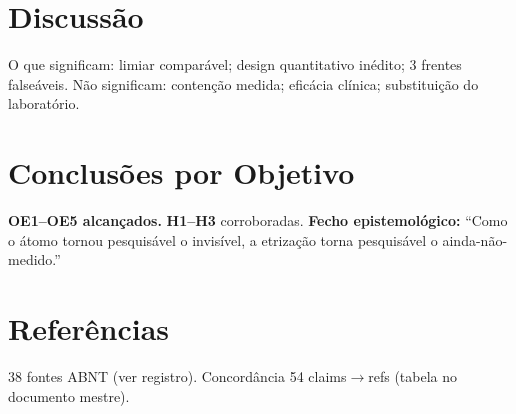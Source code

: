 \documentclass[10pt,twocolumn]{article}
\begin{document}
\section{Discussão}
O que significam: limiar comparável; design quantitativo inédito; 3 frentes falseáveis. Não significam: contenção medida; eficácia clínica; substituição do laboratório.

\section{Conclusões por Objetivo}
\textbf{OE1--OE5 alcançados.} \textbf{H1--H3} corroboradas. \textbf{Fecho epistemológico:} ``Como o átomo tornou pesquisável o invisível, a etrização torna pesquisável o ainda-não-medido.''

\section*{Referências}
38 fontes ABNT (ver registro). Concordância 54 claims$\to$refs (tabela no documento mestre).
\end{document}
